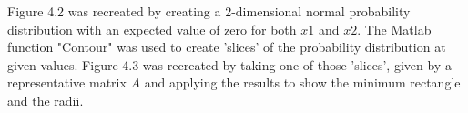 \documentclass[10pt]{article}
\begin{document}
\noindent
Figure 4.2 was recreated by creating a 2-dimensional normal probability distribution with an expected value of zero for both $x1$ and $x2$. The Matlab function "Contour" was used to create 'slices' of the probability distribution at given values. Figure 4.3 was recreated by taking one of those 'slices', given by a representative matrix $A$ and applying the results to show the minimum rectangle and the radii. 
\begin{figure} [H]
\end{figure}
\end{document}
